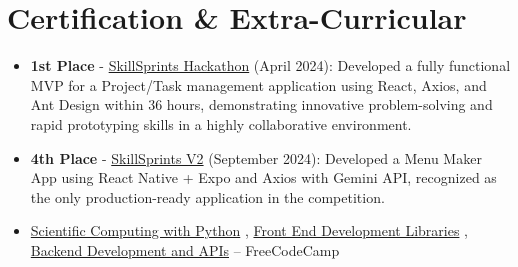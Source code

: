 \documentclass[letterpaper,11pt]{article}
\newcommand{\achievementItem}[1]{
  \item\small{
    {#1 \vspace{-6pt}}
  }
}
\begin{document}
\section{Certification \& Extra-Curricular}

\begin{itemize}[leftmargin=0.2in]
  \achievementItem{\textbf{1st Place} - \href{https://www.linkedin.com/events/skillsprintshackathon-sparkbyst7186758085367980032/}{SkillSprints Hackathon} (April 2024): Developed a fully functional MVP for a Project/Task management application using React, Axios, and Ant Design within 36 hours, demonstrating innovative problem-solving and rapid prototyping skills in a highly collaborative environment.}
  \achievementItem{\textbf{4th Place} - \href{https://www.linkedin.com/events/skillsprintsv2-thehackathond-da7236585518937829377/}{SkillSprints V2} (September 2024): Developed a Menu Maker App using React Native + Expo and Axios with Gemini API, recognized as the only production-ready application in the competition.}
  \achievementItem{\href{https://www.freecodecamp.org/certification/Bhavjit/scientific-computing-with-python-v7}{Scientific Computing with Python} , \href{https://www.freecodecamp.org/certification/Bhavjit/front-end-development-libraries}{Front End Development Libraries} , \href{https://www.freecodecamp.org/certification/Bhavjit/back-end-development-and-apis}{Backend Development and APIs} – FreeCodeCamp}
\end{itemize}

\end{document}
